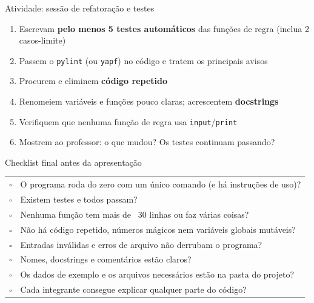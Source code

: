 \documentclass[aspectratio=169,10pt,t]{beamer}
\begin{document}
\begin{frame}{Atividade: sessão de refatoração e testes}
  \begin{enumerate}
    \item Escrevam \textbf{pelo menos 5 testes automáticos} das funções de regra (inclua 2 casos-limite)
    \item Passem o \texttt{pylint} (ou \texttt{yapf}) no código e tratem os principais avisos
    \item Procurem e eliminem \textbf{código repetido}
    \item Renomeiem variáveis e funções pouco claras; acrescentem \textbf{docstrings}
    \item Verifiquem que nenhuma função de regra usa \texttt{input}/\texttt{print}
    \item Mostrem ao professor: o que mudou? Os testes continuam passando?
  \end{enumerate}
\end{frame}

\begin{frame}{Checklist final antes da apresentação}
  \small
  \begin{tabular}{@{}cl@{}}
    $\square$ & O programa roda do zero com um único comando (e há instruções de uso)?\\
    $\square$ & Existem testes e todos passam?\\
    $\square$ & Nenhuma função tem mais de ~30 linhas ou faz várias coisas?\\
    $\square$ & Não há código repetido, números mágicos nem variáveis globais mutáveis?\\
    $\square$ & Entradas inválidas e erros de arquivo não derrubam o programa?\\
    $\square$ & Nomes, docstrings e comentários estão claros?\\
    $\square$ & Os dados de exemplo e os arquivos necessários estão na pasta do projeto?\\
    $\square$ & Cada integrante consegue explicar qualquer parte do código?\\
  \end{tabular}
\end{frame}
\end{document}
